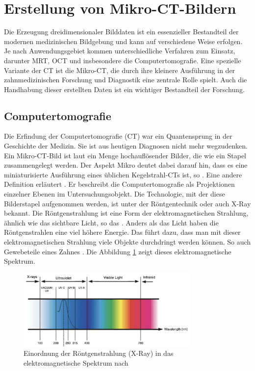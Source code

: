 \section{Erstellung von Mikro-CT-Bildern}
\label{sec:technologisch} Die Erzeugung dreidimensionaler Bilddaten ist ein essenzieller
Bestandteil der modernen medizinischen Bildgebung und kann auf verschiedene Weise
erfolgen. Je nach Anwendungsgebiet kommen unterschiedliche Verfahren zum Einsatz,
darunter \ac{MRT}, \ac{OCT} und insbesondere die Computertomografie. Eine spezielle
Variante der \ac{CT} ist die Mikro-\ac{CT}, die durch ihre kleinere Ausführung
in der zahnmedizinischen Forschung und Diagnostik eine zentrale Rolle spielt. Auch
die Handhabung dieser erstellten Daten ist ein wichtiger Bestandteil der Forschung.

\subsection{Computertomografie}
\label{subsec:computertomografie} Die Erfindung der Computertomografie (\ac{CT})
war ein Quantensprung in der Geschichte der Medizin. Sie ist aus heutigen Diagnosen
nicht mehr wegzudenken. Ein Mikro-\ac{CT}-Bild ist laut \citet[S.~1]{baird2017}
ein Menge hochauflösender Bilder, die wie ein Stapel zusammengelegt werden. Der
Aspekt Mikro deutet dabei darauf hin, dass es eine miniaturisierte Ausführung eines
üblichen Kegelstrahl-\ac{CT}s ist, so \citet[S.~340]{buzug2011}. Eine andere
Definition erläutert \citet[S.~49]{lehmann2013bildverarbeitung}. Er beschreibt
die Computertomografie als Projektionen einzelner Ebenen im Untersuchungsobjekt.
Die Technologie, mit der diese Bilderstapel aufgenommen werden, ist unter der Röntgentechnik
oder auch \ac{X-Ray} bekannt. Die Röntgenstrahlung ist eine Form der elektromagnetischen
Strahlung, ähnlich wie das sichtbare Licht, so das \citet[K.~1]{nib2024}. Anders
als das Licht haben die Röntgenstrahlen eine viel höhere Energie. Das führt dazu,
dass man mit dieser elektromagnetischen Strahlung viele Objekte durchdringt werden
können. So auch Gewebeteile eines Zahnes \citep[vgl.][K.~1]{nib2024}. Die
Abbildung \ref{fig:spectrum} zeigt dieses elektromagnetische Spektrum.

\begin{figure}[h]
	\centering
	\includegraphics[width=0.8\textwidth]{img/x_ray.jpg}
	\caption{Einordnung der Röntgenstrahlung (X-Ray) in das elektromagnetische
	Spektrum nach \citet[S.~5]{zwinkels2015}}
	\label{fig:spectrum}
\end{figure}

